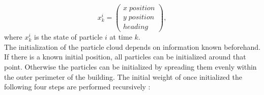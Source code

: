 \begin{equation}
x_k^i = \left(\begin{array}{l}
x \; position \\
y \; position\\
heading
\end{array}\right), 
\label{eq:pf_state}
\end{equation}
where $x^i_k$ is the state of particle $i$ at time $k$.\\
The initialization of the particle cloud depends on information known beforehand. If there is a known initial position, all particles can be initialized around that point. Otherwise the particles can be initialized by spreading them evenly within the outer perimeter of the building. The initial weight of  once initialized the following four steps are performed recursively \cite{Wu2019,Woodman2008}: 

